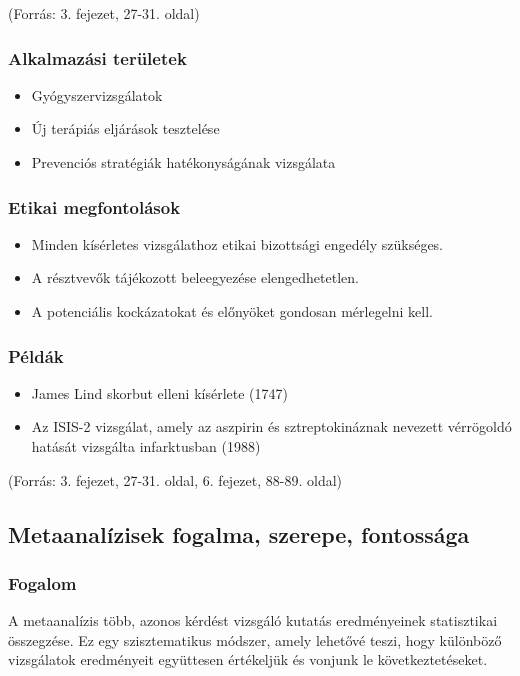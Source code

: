 \documentclass[a4paper,12pt]{article}
\begin{document}
    (Forrás: 3. fejezet, 27-31. oldal)

    \subsubsection{Alkalmazási területek}
    \begin{itemize}
        \item Gyógyszervizsgálatok
        \item Új terápiás eljárások tesztelése
        \item Prevenciós stratégiák hatékonyságának vizsgálata
    \end{itemize}

    \subsubsection{Etikai megfontolások}
    \begin{itemize}
        \item Minden kísérletes vizsgálathoz etikai bizottsági engedély szükséges.
        \item A résztvevők tájékozott beleegyezése elengedhetetlen.
        \item A potenciális kockázatokat és előnyöket gondosan mérlegelni kell.
    \end{itemize}

    \subsubsection{Példák}
    \begin{itemize}
        \item James Lind skorbut elleni kísérlete (1747)
        \item Az ISIS-2 vizsgálat, amely az aszpirin és sztreptokináznak nevezett vérrögoldó hatását vizsgálta infarktusban (1988)
    \end{itemize}

    (Forrás: 3. fejezet, 27-31. oldal, 6. fejezet, 88-89. oldal)

    \subsection{Metaanalízisek fogalma, szerepe, fontossága}

    \subsubsection{Fogalom}
    A metaanalízis több, azonos kérdést vizsgáló kutatás eredményeinek statisztikai összegzése. Ez egy szisztematikus módszer, amely lehetővé teszi, hogy különböző vizsgálatok eredményeit együttesen értékeljük és vonjunk le következtetéseket.
\end{document}
